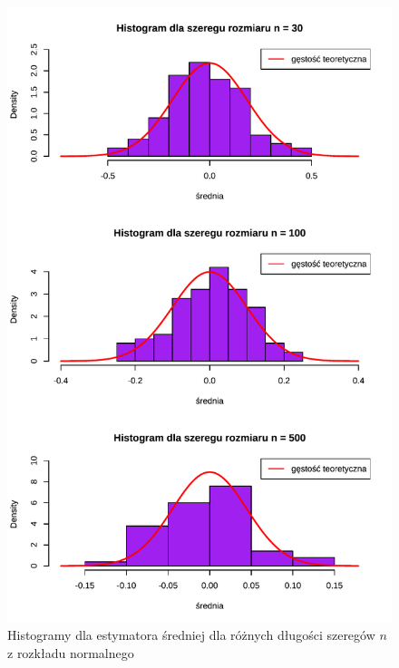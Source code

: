 \documentclass[10pt, a4paper]{article}\usepackage[]{graphicx}\usepackage[]{xcolor}
\makeatletter
\def\maxwidth{ %
  \ifdim\Gin@nat@width>\linewidth
    \linewidth
  \else
    \Gin@nat@width
  \fi
}
\newenvironment{knitrout}{}{} %
\makeatother
\begin{document}
\begin{knitrout}
\color{fgcolor}\begin{figure}[H]

{\centering \includegraphics[width=\maxwidth]{figure/analiza-sredniej-norm-hist-1} 

}

\caption[Histogramy dla estymatora średniej dla różnych długości szeregów $n$ z rozkładu normalnego]{Histogramy dla estymatora średniej dla różnych długości szeregów $n$ z rozkładu normalnego}\label{fig:analiza-sredniej-norm-hist}
\end{figure}

\end{knitrout}
\end{document}
